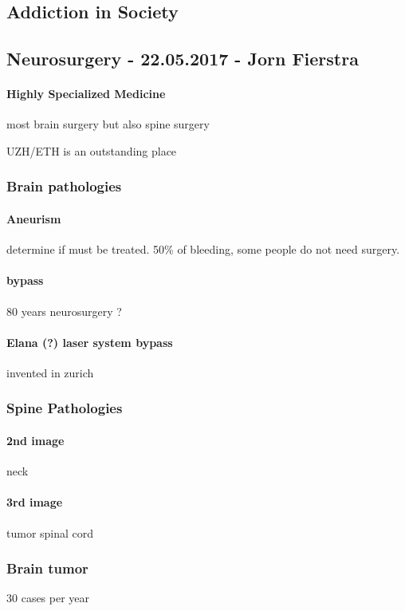\documentclass[12pt,article,oneside,a4paper]{memoir}
\begin{document}
\subsection{Addiction in Society}

\newpage
\subsection{Neurosurgery - 22.05.2017 - Jorn Fierstra}
\paragraph{Highly Specialized Medicine} most brain surgery but also spine surgery

UZH/ETH is an outstanding place

\subsubsection{Brain pathologies}
\paragraph{Aneurism} determine if must be treated. 50\% of bleeding, some people do not need surgery.
\paragraph{bypass} 80 years neurosurgery ?
\paragraph{Elana (?) laser system bypass} invented in zurich

\subsubsection{Spine Pathologies}
\paragraph{2nd image} neck
\paragraph{3rd image} tumor spinal cord

\subsubsection{Brain tumor} 30 cases per year
\end{document}
